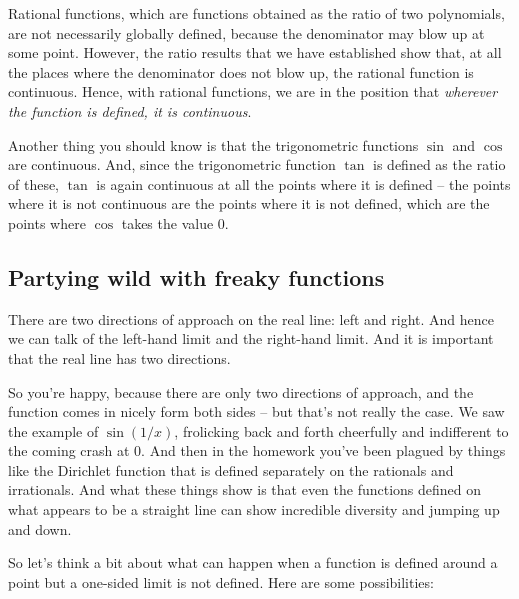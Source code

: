 \documentclass[10pt]{amsart}
\begin{document}
Rational functions, which are functions obtained as the ratio of two
polynomials, are not necessarily globally defined, because the
denominator may blow up at some point. However, the ratio results that
we have established show that, at all the places where the denominator
does not blow up, the rational function is continuous. Hence, with
rational functions, we are in the position that {\em wherever the function
is defined, it is continuous}.

Another thing you should know is that the trigonometric functions
$\sin$ and $\cos$ are continuous. And, since the trigonometric
function $\tan$ is defined as the ratio of these, $\tan$ is again
continuous at all the points where it is defined -- the points where
it is not continuous are the points where it is not defined, which are
the points where $\cos$ takes the value $0$.

\subsection{Partying wild with freaky functions}

There are two directions of approach on the real line: left and
right. And hence we can talk of the left-hand limit and the right-hand
limit. And it is important that the real line has two directions.

So you're happy, because there are only two directions of approach,
and the function comes in nicely form both sides -- but that's not
really the case. We saw the example of $\sin(1/x)$, frolicking back
and forth cheerfully and indifferent to the coming crash at $0$. And
then in the homework you've been plagued by things like the Dirichlet
function that is defined separately on the rationals and
irrationals. And what these things show is that even the functions
defined on what appears to be a straight line can show incredible
diversity and jumping up and down.

So let's think a bit about what can happen when a function is defined
around a point but a one-sided limit is not defined. Here are some
possibilities:
\end{document}
